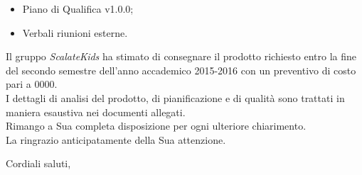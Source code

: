 \documentclass{letter}
\begin{document}
\begin{letter}
\begin{itemize}
\begin{itemize}
    \item Piano di Qualifica v1.0.0;
    \item Verbali riunioni esterne.
    \end{itemize}
  \end{itemize}
  Il gruppo \textit{ScalateKids} ha stimato di consegnare il prodotto richiesto entro la fine del secondo semestre dell'anno accademico 2015-2016
  con un preventivo di costo pari a 0000.\\
  I dettagli di analisi del prodotto, di pianificazione e di qualità sono trattati in maniera esaustiva nei documenti allegati.\\
  Rimango a Sua completa disposizione per ogni ulteriore chiarimento.\\
  La ringrazio anticipatamente della Sua attenzione.
  \closing{Cordiali saluti,}
\end{letter}
\end{document}
